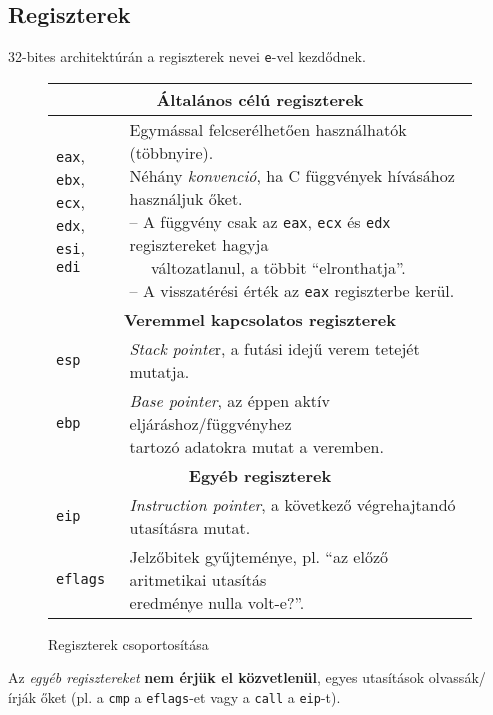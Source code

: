 \subsection{Regiszterek}

32-bites architektúrán a regiszterek nevei \texttt{e}-vel kezdődnek.

\begin{figure}[h]
	\centering
	\begin{tabular}{|l|l|}
		\hline\hline
		\multicolumn{2}{|c|}{\textbf{Általános célú regiszterek}} \\
		\hline
		\makecell[l]{\texttt{eax}, \texttt{ebx}, \\ \texttt{ecx}, \texttt{edx}, \\ \texttt{esi}, \texttt{edi}} &  \makecell[l]{Egymással felcserélhetően használhatók (többnyire). \\
		Néhány \textit{konvenció}, ha C függvények hívásához használjuk őket. \\
		-- A függvény csak az \texttt{eax}, \texttt{ecx} és \texttt{edx} regisztereket hagyja \\
		~~ változatlanul, a többit ``elronthatja''. \\
		-- A visszatérési érték az \texttt{eax} regiszterbe kerül.
		}	\\
		\hline\hline
		\multicolumn{2}{|c|}{\textbf{Veremmel kapcsolatos regiszterek}} \\
		\hline
		\texttt{esp} & \textit{Stack pointe}r, a futási idejű verem tetejét mutatja. \\
		\hline
		\texttt{ebp} & \makecell[l]{\textit{Base pointer}, az éppen aktív eljáráshoz/függvényhez \\ tartozó adatokra mutat a veremben.} \\
		\hline\hline
		\multicolumn{2}{|c|}{\textbf{Egyéb regiszterek}} \\
		\hline
		\texttt{eip} & \textit{Instruction pointer}, a következő végrehajtandó utasításra mutat. \\
		\hline
		\texttt{eflags} & \makecell[l]{Jelzőbitek gyűjteménye, pl. ``az előző aritmetikai utasítás \\ eredménye nulla volt-e?''.} \\
		\hline
	\end{tabular}
	\caption{Regiszterek csoportosítása}
\end{figure}

Az \textit{egyéb regisztereket} \textbf{nem érjük el közvetlenül}, egyes utasítások olvassák/írják őket (pl. a \texttt{cmp} a \texttt{eflags}-et vagy a \texttt{call} a \texttt{eip}-t).

